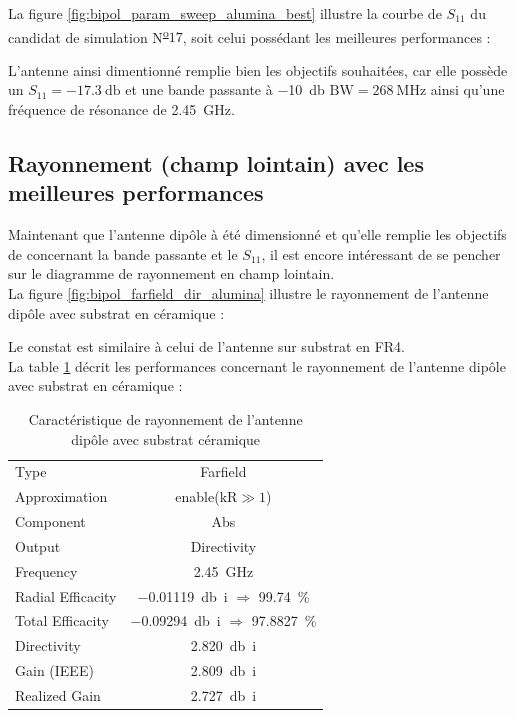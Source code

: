 \documentclass[Deriaz_Traiber_Labo02]{subfiles}
\begin{document}
\pagebreak

La figure \ref{fig:bipol_param_sweep_alumina_best} illustre la courbe de $S_{11}$ du candidat de simulation N\textsuperscript{\underline{o}}$17$, soit celui possédant les meilleures performances :


L'antenne ainsi dimentionné remplie bien les objectifs souhaitées, car elle possède un $S_{11} = \SI{-17.3}{\decibel}$ et une bande passante à \SI{-10}{\decibel} $\text{BW} = \SI{268}{\mega\hertz}$ ainsi qu'une fréquence de résonance de \SI{2.45}{\giga\hertz}.

\pagebreak

\subsection{Rayonnement (champ lointain) avec les meilleures performances}

Maintenant que l'antenne dipôle à été dimensionné et qu'elle remplie les objectifs de concernant la bande passante et le $S_{11}$, il est encore intéressant de se pencher sur le diagramme de rayonnement en champ lointain.\\

La figure \ref{fig:bipol_farfield_dir_alumina} illustre le rayonnement de l'antenne dipôle avec substrat en céramique :


Le constat est similaire à celui de l'antenne sur substrat en FR4.\\

La table \ref{tab:ray-alumina} décrit les performances concernant le rayonnement de l'antenne dipôle avec substrat en céramique : 

\begin{table}[H]
\centering
\begin{tabular}{l c}\hline
Type					& Farfield\\
Approximation		& enable($\text{kR}\gg1$)\\
Component			& Abs\\
Output				& Directivity\\
Frequency			& \SI{2.45}{\giga\hertz}\\
Radial Efficacity	& \SI{-0.01119}{\decibel i} $\Rightarrow$ \SI{99.74}{\percent}\\
Total Efficacity		& \SI{-0.09294}{\decibel i} $\Rightarrow$ \SI{97.8827}{\percent}\\
Directivity			& \SI{2.820}{\decibel i}\\
Gain	 (IEEE)			& \SI{2.809}{\decibel i}\\
Realized Gain		& \SI{2.727}{\decibel i}\\\hline
\end{tabular}
\caption{Caractéristique de rayonnement de l'antenne dipôle avec substrat céramique}
\label{tab:ray-alumina}
\end{table}
\end{document}

